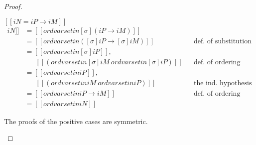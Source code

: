\begin{proof}
\begin{caseof}
    \item $[[iN = iP → iM]]$
       \begin{align*}
        [[ ord varset in [σ]iN ]] &= [[ ord varset in [σ](iP → iM) ]] \\
                                   &= [[ ord varset in ([σ]iP → [σ]iM) ]]
                                   && \text{def. of substitution}\\
                                   &= [[ ord varset in [σ]iP]],\\
                                   &\phantom{=} ~ [[(ord varset in [σ]iM \ {ord varset in [σ]iP}) ]]
                                   && \text{def. of ordering}\\
                                   &= [[ ord varset in iP]],\\
                                   &\phantom{=} ~ [[(ord varset in iM \ {ord varset in iP}) ]]
                                   && \text{the ind. hypothesis}\\
                                   &= [[ ord varset in iP → iM ]]
                                   && \text{def. of ordering}\\
                                   &= [[ ord varset in iN ]]
       \end{align*}
    \item The proofs of the positive cases are symmetric.
  \end{caseof}
\end{proof}

